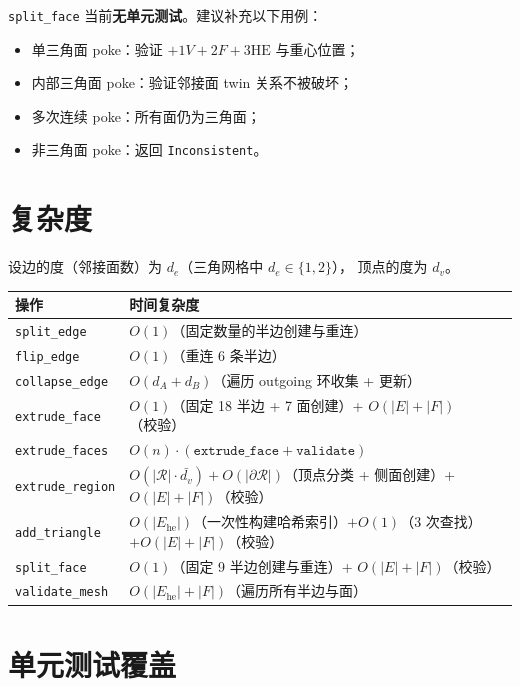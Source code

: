 \documentclass[11pt,a4paper]{article}
\begin{document}
\texttt{split\_face} 当前\textbf{无单元测试}。建议补充以下用例：

\begin{itemize}
  \item 单三角面 poke：验证 $+1V +2F +3\text{HE}$ 与重心位置；
  \item 内部三角面 poke：验证邻接面 twin 关系不被破坏；
  \item 多次连续 poke：所有面仍为三角面；
  \item 非三角面 poke：返回 \texttt{Inconsistent}。
\end{itemize}

\section{复杂度}

设边的度（邻接面数）为 $d_e$（三角网格中 $d_e \in \{1, 2\}$），
顶点的度为 $d_v$。

\begin{center}
\renewcommand{\arraystretch}{1.18}
\begin{tabular}{@{}ll@{}}
  \toprule
  \textbf{操作} & \textbf{时间复杂度} \\
  \midrule
  \texttt{split\_edge}     & $O(1)$（固定数量的半边创建与重连） \\
  \texttt{flip\_edge}      & $O(1)$（重连 6 条半边） \\
  \texttt{collapse\_edge}  & $O(d_A + d_B)$（遍历 outgoing 环收集 + 更新） \\
  \texttt{extrude\_face}   & $O(1)$（固定 18 半边 + 7 面创建）+ $O(|E|+|F|)$（校验） \\
  \texttt{extrude\_faces}  & $O(n) \cdot (\texttt{extrude\_face} + \texttt{validate})$ \\
  \texttt{extrude\_region} & $O(|\mathcal{R}| \cdot \bar{d_v}) + O(|\partial\mathcal{R}|)$（顶点分类 + 侧面创建）+ $O(|E|+|F|)$（校验） \\
  \texttt{add\_triangle}   & $O(|E_{\mathrm{he}}|)$（一次性构建哈希索引）$+ O(1)$（3 次查找）$+ O(|E|+|F|)$（校验） \\
  \texttt{split\_face}     & $O(1)$（固定 9 半边创建与重连）+ $O(|E|+|F|)$（校验） \\
  \texttt{validate\_mesh}  & $O(|E_{\mathrm{he}}| + |F|)$（遍历所有半边与面） \\
  \bottomrule
\end{tabular}
\end{center}

\section{单元测试覆盖}
\end{document}
